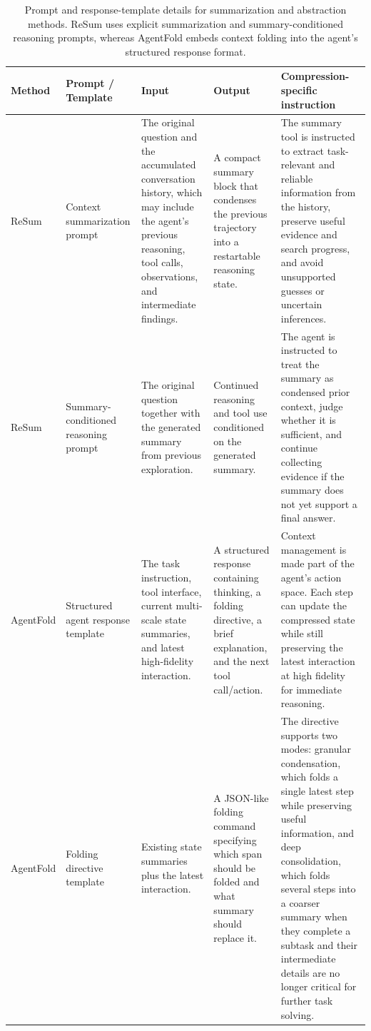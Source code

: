 \begin{table}[t]
\centering
\small
\setlength{\tabcolsep}{3pt}
\renewcommand{\arraystretch}{1.08}

\begin{tabularx}{\textwidth}{@{}
>{\raggedright\arraybackslash}p{1.55cm}
>{\raggedright\arraybackslash}p{2.25cm}
>{\raggedright\arraybackslash}X
>{\raggedright\arraybackslash}X
>{\raggedright\arraybackslash}X
@{}}
\hline
\textbf{Method} & \textbf{Prompt / Template} & \textbf{Input} & \textbf{Output} & \textbf{Compression-specific instruction} \\
\hline
ReSum \citep{wu2026resumunlockinglonghorizonsearch}
&
Context summarization prompt
&
The original question and the accumulated conversation history, which may include the agent's previous reasoning, tool calls, observations, and intermediate findings.
&
A compact summary block that condenses the previous trajectory into a restartable reasoning state.
&
The summary tool is instructed to extract task-relevant and reliable information from the history, preserve useful evidence and search progress, and avoid unsupported guesses or uncertain inferences.
\\
\hline
ReSum \citep{wu2026resumunlockinglonghorizonsearch}
&
Summary-conditioned reasoning prompt
&
The original question together with the generated summary from previous exploration.
&
Continued reasoning and tool use conditioned on the generated summary.
&
The agent is instructed to treat the summary as condensed prior context, judge whether it is sufficient, and continue collecting evidence if the summary does not yet support a final answer.
\\
\hline
AgentFold \citep{ye2025agentfoldlonghorizonwebagents}
&
Structured agent response template
&
The task instruction, tool interface, current multi-scale state summaries, and latest high-fidelity interaction.
&
A structured response containing thinking, a folding directive, a brief explanation, and the next tool call/action.
&
Context management is made part of the agent's action space. Each step can update the compressed state while still preserving the latest interaction at high fidelity for immediate reasoning.
\\
\hline
AgentFold \citep{ye2025agentfoldlonghorizonwebagents}
&
Folding directive template
&
Existing state summaries plus the latest interaction.
&
A JSON-like folding command specifying which span should be folded and what summary should replace it.
&
The directive supports two modes: granular condensation, which folds a single latest step while preserving useful information, and deep consolidation, which folds several steps into a coarser summary when they complete a subtask and their intermediate details are no longer critical for further task solving.
\\
\hline
\end{tabularx}
\caption{Prompt and response-template details for summarization and abstraction methods. ReSum uses explicit summarization and summary-conditioned reasoning prompts, whereas AgentFold embeds context folding into the agent's structured response format.}
\label{tab:app-c1-prompts}
\end{table}

